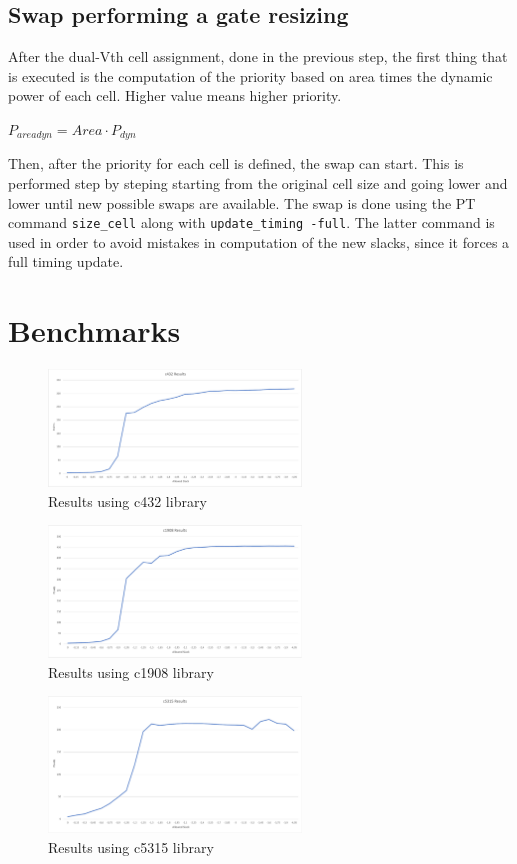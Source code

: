 \documentclass{article}
\begin{document}
		\subsection{Swap performing a gate resizing}
		After the dual-Vth cell assignment, done in the previous step, the first thing that is executed is the computation of the priority based on area times the dynamic power of each cell. Higher value means higher priority.
		
		\begin{center}
			$P_{areadyn} = Area \cdot P_{dyn}$
		\end{center}
		
		
		Then, after the priority for each cell is defined, the swap can start. This is performed step by steping starting from the original cell size and going lower and lower until new possible swaps are available. The swap is done using the PT command \texttt{size\_cell} along with \texttt{update\_timing -full}. The latter command is used in order to avoid mistakes in computation of the new slacks, since it forces a full timing update. 
		
		\newpage
				\thispagestyle{empty}
		\section{Benchmarks}
		\begin{figure}[ht]
			\centering
			\includegraphics[width=0.6\textwidth]{Immagini/c432.pdf}
		\caption{Results using c432 library}
		\label{benchmark1}
	\end{figure}

	\begin{figure}[ht]
		\centering
		\includegraphics[width=0.6\textwidth]{Immagini/c1908.pdf}
		\caption{Results using c1908 library}
		\label{benchmark2}
	\end{figure}

	\begin{figure}[ht]
		\centering
		\includegraphics[width=0.6\textwidth]{Immagini/c5315.pdf}
		\caption{Results using c5315 library}
		\label{benchmark3}
	\end{figure}
	
	
\end{document}
